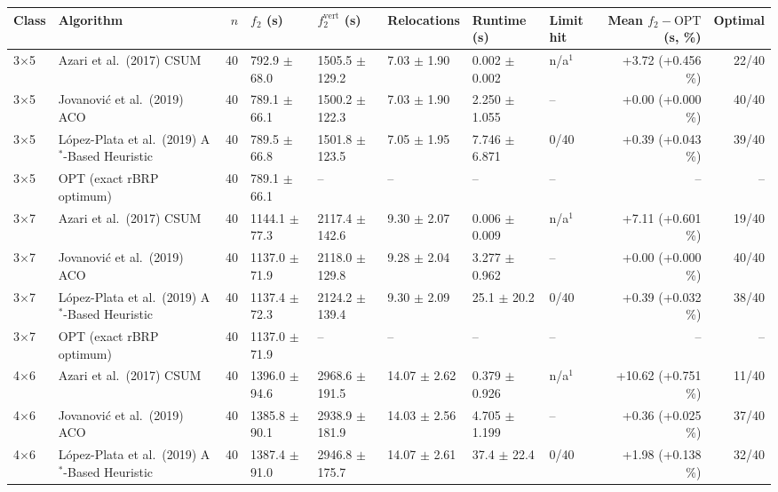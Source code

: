 \begin{table}[htbp]
\centering
\small
\begin{tabular}{llrlllllrr}
\toprule
Class & Algorithm & $n$ & $f_2$ (s) & $f_2^{\mathrm{vert}}$ (s) & Relocations & Runtime (s) & Limit hit & Mean $f_2 - \mathrm{OPT}$ (s, \%) & Optimal \\
\midrule
3$\times$5 & Azari et al.\ (2017) CSUM & 40 & 792.9 $\pm$ 68.0 & 1505.5 $\pm$ 129.2 & 7.03 $\pm$ 1.90 & 0.002 $\pm$ 0.002 & n/a$^{1}$ & +3.72 (+0.456 \%) & 22/40 \\
3$\times$5 & Jovanovi\'{c} et al.\ (2019) ACO & 40 & 789.1 $\pm$ 66.1 & 1500.2 $\pm$ 122.3 & 7.03 $\pm$ 1.90 & 2.250 $\pm$ 1.055 & -- & +0.00 (+0.000 \%) & 40/40 \\
3$\times$5 & L\'{o}pez-Plata et al.\ (2019) A$^\ast$-Based Heuristic & 40 & 789.5 $\pm$ 66.8 & 1501.8 $\pm$ 123.5 & 7.05 $\pm$ 1.95 & 7.746 $\pm$ 6.871 & 0/40 & +0.39 (+0.043 \%) & 39/40 \\
3$\times$5 & OPT (exact rBRP optimum) & 40 & 789.1 $\pm$ 66.1 & -- & -- & -- & -- & -- & -- \\
\midrule
3$\times$7 & Azari et al.\ (2017) CSUM & 40 & 1144.1 $\pm$ 77.3 & 2117.4 $\pm$ 142.6 & 9.30 $\pm$ 2.07 & 0.006 $\pm$ 0.009 & n/a$^{1}$ & +7.11 (+0.601 \%) & 19/40 \\
3$\times$7 & Jovanovi\'{c} et al.\ (2019) ACO & 40 & 1137.0 $\pm$ 71.9 & 2118.0 $\pm$ 129.8 & 9.28 $\pm$ 2.04 & 3.277 $\pm$ 0.962 & -- & +0.00 (+0.000 \%) & 40/40 \\
3$\times$7 & L\'{o}pez-Plata et al.\ (2019) A$^\ast$-Based Heuristic & 40 & 1137.4 $\pm$ 72.3 & 2124.2 $\pm$ 139.4 & 9.30 $\pm$ 2.09 & 25.1 $\pm$ 20.2 & 0/40 & +0.39 (+0.032 \%) & 38/40 \\
3$\times$7 & OPT (exact rBRP optimum) & 40 & 1137.0 $\pm$ 71.9 & -- & -- & -- & -- & -- & -- \\
\midrule
4$\times$6 & Azari et al.\ (2017) CSUM & 40 & 1396.0 $\pm$ 94.6 & 2968.6 $\pm$ 191.5 & 14.07 $\pm$ 2.62 & 0.379 $\pm$ 0.926 & n/a$^{1}$ & +10.62 (+0.751 \%) & 11/40 \\
4$\times$6 & Jovanovi\'{c} et al.\ (2019) ACO & 40 & 1385.8 $\pm$ 90.1 & 2938.9 $\pm$ 181.9 & 14.03 $\pm$ 2.56 & 4.705 $\pm$ 1.199 & -- & +0.36 (+0.025 \%) & 37/40 \\
4$\times$6 & L\'{o}pez-Plata et al.\ (2019) A$^\ast$-Based Heuristic & 40 & 1387.4 $\pm$ 91.0 & 2946.8 $\pm$ 175.7 & 14.07 $\pm$ 2.61 & 37.4 $\pm$ 22.4 & 0/40 & +1.98 (+0.138 \%) & 32/40 \\

\end{tabular}
\end{table}
